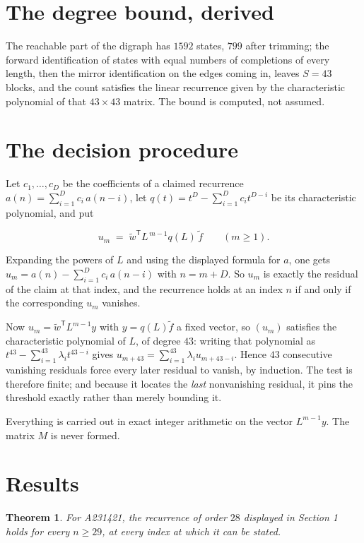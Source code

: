\documentclass[11pt]{article}
\newtheorem{theorem}{Theorem}
\theoremstyle{definition}
\begin{document}
\section{The degree bound, derived}

The reachable part of the digraph has $1592$ states, $799$ after trimming; the forward identification of states with equal numbers of completions of every length, then the mirror identification on the edges coming in, leaves $S = 43$ blocks, and the count satisfies the linear recurrence given by the characteristic polynomial of that $43\times43$ matrix. The bound is computed, not assumed.

\section{The decision procedure}

Let $c_1,\dots,c_D$ be the coefficients of a claimed recurrence $a(n) = \sum_{i=1}^{D} c_i\,a(n-i)$, let $q(t) = t^{D} - \sum_{i=1}^{D} c_i t^{D-i}$ be its characteristic polynomial, and put

\[u_m \;=\; \tilde w^{\mathsf T} L^{\,m-1} q(L)\,\tilde f \qquad (m \ge 1).\]

Expanding the powers of $L$ and using the displayed formula for $a$, one gets $u_m = a(n) - \sum_{i=1}^{D} c_i\,a(n-i)$ with $n = m + D$. So $u_m$ is exactly the residual of the claim at that index, and the recurrence holds at an index $n$ if and only if the corresponding $u_m$ vanishes.

Now $u_m = \tilde w^{\mathsf T} L^{m-1} y$ with $y = q(L)\tilde f$ a fixed vector, so $(u_m)$ satisfies the characteristic polynomial of $L$, of degree $43$: writing that polynomial as $t^{43} - \sum_{i=1}^{43} \lambda_i t^{43-i}$ gives $u_{m+43} = \sum_{i=1}^{43} \lambda_i u_{m+43-i}$. Hence $43$ consecutive vanishing residuals force every later residual to vanish, by induction. The test is therefore finite; and because it locates the {\itshape last} nonvanishing residual, it pins the threshold exactly rather than merely bounding it.

Everything is carried out in exact integer arithmetic on the vector $L^{m-1}y$. The matrix $M$ is never formed.

\section{Results}

\begin{theorem} For A231421, the recurrence of order $28$ displayed in Section 1 holds for every $n \ge 29$, at every index at which it can be stated.\end{theorem}
\end{document}
